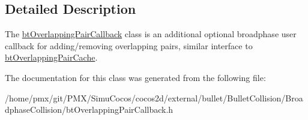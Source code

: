 \subsection{Detailed Description}
The \hyperlink{classbtOverlappingPairCallback}{bt\+Overlapping\+Pair\+Callback} class is an additional optional broadphase user callback for adding/removing overlapping pairs, similar interface to \hyperlink{classbtOverlappingPairCache}{bt\+Overlapping\+Pair\+Cache}. 

The documentation for this class was generated from the following file\+:\begin{DoxyCompactItemize}
\item 
/home/pmx/git/\+P\+M\+X/\+Simu\+Cocos/cocos2d/external/bullet/\+Bullet\+Collision/\+Broadphase\+Collision/bt\+Overlapping\+Pair\+Callback.\+h\end{DoxyCompactItemize}
